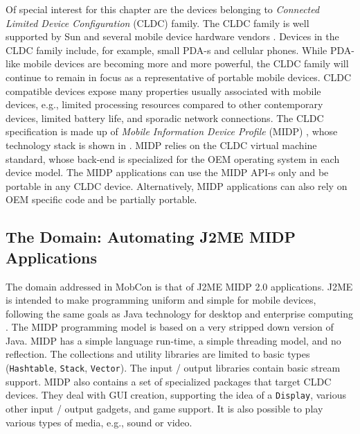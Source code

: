 Of special interest for this chapter are the devices belonging to \textit{Connected Limited Device Configuration} (CLDC) family. The CLDC family is well supported by Sun and several mobile device hardware vendors \cite{www.j2me.vendors,j2me.2005}. Devices in the CLDC family include, for example, small PDA-s and cellular phones. While PDA-like mobile devices are becoming more and more powerful, the CLDC family will continue to remain in focus as a representative of portable mobile devices. CLDC compatible devices expose many properties usually associated with mobile devices, e.g., limited processing resources compared to other contemporary devices, limited battery life, and sporadic network connections. The CLDC specification is made up of \textit{Mobile Information Device Profile} (MIDP) \cite{www.midp-ota}, whose technology stack is shown in . MIDP relies on the CLDC virtual machine standard, whose back-end is specialized for the OEM operating system in each device model. The MIDP applications can use the MIDP API-s only and be portable in any CLDC device. Alternatively, MIDP applications can also rely on OEM specific code and be partially portable.

\subsection{The Domain: Automating J2ME MIDP Applications}

The domain addressed in MobCon is that of J2ME MIDP 2.0 \cite{www.midp-ota} applications. J2ME is intended to make programming uniform and simple for mobile devices, following the same goals as Java technology for desktop and enterprise computing \cite{pervasive.java.02}. The MIDP programming model \cite{www.nokia.ep} is based on a very stripped down version of Java. MIDP has a simple language run-time, a simple threading model, and no reflection. The collections and utility libraries are limited to basic types (\texttt{Hashtable}, \texttt{Stack}, \texttt{Vector}). The input / output libraries contain basic stream support. MIDP also contains a set of specialized packages that target CLDC devices. They deal with GUI creation, supporting the idea of a \texttt{Display}, various other input / output gadgets, and game support. It is also possible to play various types of media, e.g., sound or video.

